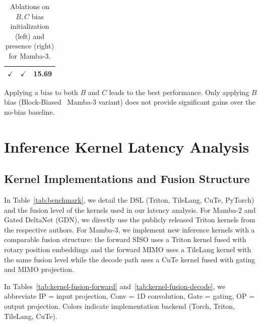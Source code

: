 \documentclass{article}
\newcommand{\citep}{\parencite}
\newcommand{\torch}[1]{\textcolor{TorchCol}{#1}}
\newcommand{\triton}[1]{\textcolor{TritonCol}{#1}}
\newcommand{\cute}[1]{\textcolor{CuTeCol}{#1}}
\newcommand{\tilelang}[1]{\textcolor{TileLangCol}{#1}}
\theoremstyle{plain}
\theoremstyle{definition}
\theoremstyle{remark}
\begin{document}
\begin{table}[h]
{\begin{subtable}[t]{0.45\textwidth}
\begin{tabular}{c c c}
                $\checkmark$  & $\checkmark$  & 15.69 \\
                \bottomrule
            \end{tabular}
            \caption{Applying a bias to both $B$ and $C$ leads to the best performance. Only applying $B$ bias (Block-Biased~\citep{yu2025blockbiasedmamba} Mamba-3 variant) does not provide significant gains over the no-bias baseline.}
            \label{tab:bc_bias_presence}
        \end{subtable}
    }
    \caption{Ablations on $B,C$ bias initialization (left) and presence (right) for Mamba-3.}
    \label{tab:bc_combined}
\end{table}

\section{Inference Kernel Latency Analysis}
\label{app:inference-details}

\subsection{Kernel Implementations and Fusion Structure}
In Table~\ref{tab:benchmark}, we detail the DSL (Triton, TileLang, CuTe, PyTorch) and the fusion level of the kernels used in our latency analysis.
For Mamba-2 and Gated DeltaNet (GDN), we directly use the publicly released Triton kernels from the respective authors. 
For Mamba-3, we implement new inference kernels with a comparable fusion structure: the forward SISO uses a Triton kernel fused with rotary position embeddings and the forward MIMO uses a TileLang kernel with the same fusion level while the decode path uses a CuTe kernel fused with gating and MIMO projection. 

In Tables~\ref{tab:kernel-fusion-forward} and~\ref{tab:kernel-fusion-decode}, 
we abbreviate IP = input projection, Conv = 1D convolution, Gate = gating, 
OP = output projection. Colors indicate implementation backend
(\torch{Torch}, \triton{Triton}, \tilelang{TileLang}, \cute{CuTe}).
\end{document}
